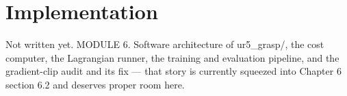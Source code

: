 \chapter{Implementation}\label{ch:implementation}

\begin{draftnote}
Not written yet. MODULE 6. Software architecture of ur5\_grasp/, the cost computer, the Lagrangian runner, the training and evaluation pipeline, and the gradient-clip audit and its fix --- that story is currently squeezed into Chapter 6 section 6.2 and deserves proper room here.
\end{draftnote}
